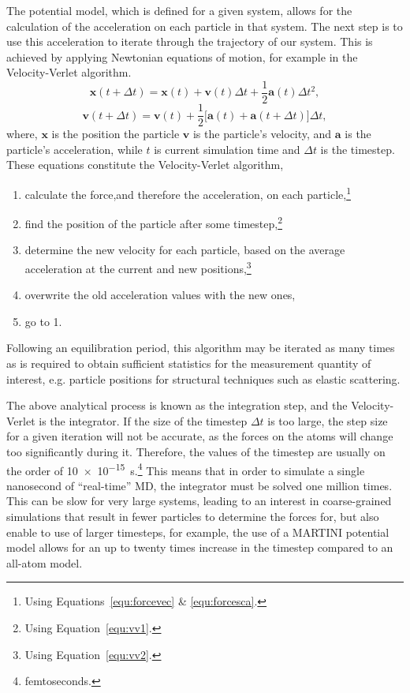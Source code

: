 The potential model, which is defined for a given system, allows for the calculation of the acceleration on each particle in that system.
The next step is to use this acceleration to iterate through the trajectory of our system.
This is achieved by applying Newtonian equations of motion, for example in the Velocity-Verlet algorithm.\autocite{swope_computer_1982}
%
\begin{equation}
\mathbf{x}(t + \Delta t) = \mathbf{x}(t) + \mathbf{v}(t)\Delta t + \frac{1}{2}\mathbf{a}(t)\Delta t^2,
\label{equ:vv1}
\end{equation}
\begin{equation}
\mathbf{v}(t + \Delta t) = \mathbf{v}(t) + \frac{1}{2}\big[\mathbf{a}(t) + \mathbf{a}(t+\Delta t)\big]\Delta t,
\label{equ:vv2}
\end{equation}
%
where, $\mathbf{x}$ is the position the particle $\mathbf{v}$ is the particle's velocity, and $\mathbf{a}$ is the particle's acceleration, while $t$ is current simulation time and $\Delta t$ is the timestep.
These equations constitute the Velocity-Verlet algorithm,
%
\begin{enumerate}
\item calculate the force,and therefore the acceleration, on each particle,\footnote{Using Equations~\protect\ref{equ:forcevec} \& \protect\ref{equ:forcesca}.}
\item find the position of the particle after some timestep,\footnote{Using Equation~\protect\ref{equ:vv1}.}
\item determine the new velocity for each particle, based on the average acceleration at the current and new positions,\footnote{Using Equation~\protect\ref{equ:vv2}.}
\item overwrite the old acceleration values with the new ones,
\item go to 1.
\end{enumerate}
%
Following an equilibration period, this algorithm may be iterated as many times as is required to obtain sufficient statistics for the measurement quantity of interest, e.g. particle positions for structural techniques such as elastic scattering.

The above analytical process is known as the integration step, and the Velocity-Verlet is the integrator.
If the size of the timestep $\Delta t$ is too large, the step size for a given iteration will not be accurate, as the forces on the atoms will change too significantly during it.
Therefore, the values of the timestep are usually on the order of \SI{10e-15}{\second}.\footnote{femtoseconds.}
This means that in order to simulate a single nanosecond of ``real-time'' MD, the integrator must be solved one million times.
This can be slow for very large systems, leading to an interest in coarse-grained simulations that result in fewer particles to determine the forces for, but also enable to use of larger timesteps, for example, the use of a MARTINI potential model allows for an up to twenty times increase in the timestep compared to an all-atom model.

